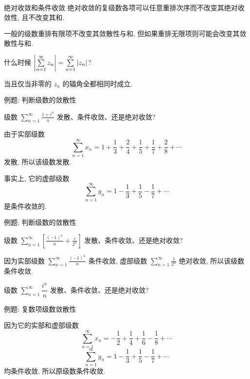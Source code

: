 \begin{frame}{绝对收敛和条件收敛}
\onslide<+->
绝对收敛的复级数各项可以任意重排次序而不改变其绝对收敛性, 且不改变其和.

\onslide<+->
一般的级数重排有限项不改变其敛散性与和, 但如果重排无限项则可能会改变其敛散性与和.
\begin{thinking}
什么时候 $\left|\sum\limits_{n=1}^\infty z_n\right|=\sum\limits_{n=1}^\infty|z_n|$?
\end{thinking}
\begin{answer}
当且仅当非零的 $z_n$ 的辐角全都相同时成立.
\end{answer}
\end{frame}


\begin{frame}{例题: 判断级数的敛散性}
\beqskip{3pt}
\begin{example}
级数 $\displaystyle\sum_{n=1}^\infty\frac{1+i^n}n$ 发散、条件收敛、还是绝对收敛?
\end{example}
\begin{solution}
由于实部级数
\[\sum_{n=1}^\infty x_n=
1+\frac13+\frac24+\frac15+\frac17+\frac28+\cdots\]
发散, 所以该级数发散.
\end{solution}
\onslide<+->
事实上, 它的虚部级数
\[\sum_{n=1}^\infty y_n=
1-\frac13+\frac15-\frac17+\cdots\]
是条件收敛的.
\endgroup
\end{frame}


\begin{frame}{例题: 判断级数的敛散性}
\begin{example}
级数 $\displaystyle\sum_{n=1}^\infty\left[\frac{(-1)^n}n+\frac i{2^n}\right]$ 发散、条件收敛、还是绝对收敛?
\end{example}
\begin{solution}
因为实部级数 $\displaystyle\sum_{n=1}^\infty\frac{(-1)^n}n$ 条件收敛,
\onslide<+->
虚部级数 $\displaystyle\sum_{n=1}^\infty\frac1{2^n}$ 绝对收敛,
\onslide<+->
所以该级数条件收敛.
\end{solution}
\begin{example}
级数 $\displaystyle\sum_{n=1}^\infty\dfrac{i^n}n$ 发散、条件收敛、还是绝对收敛?
\end{example}
\end{frame}



\begin{frame}{例题: 复数项级数敛散性}
\begin{solution}
因为它的实部和虚部级数
\[\sum_{n=1}^\infty x_n=-\frac12+\frac14+\frac16-\frac18+\cdots\]
\onslide<+->
\[\sum_{n=1}^\infty y_n=1-\frac13+\frac15-\frac17+\cdots\]
均条件收敛,
\onslide<+->
所以原级数条件收敛.
\end{solution}
\end{frame}



